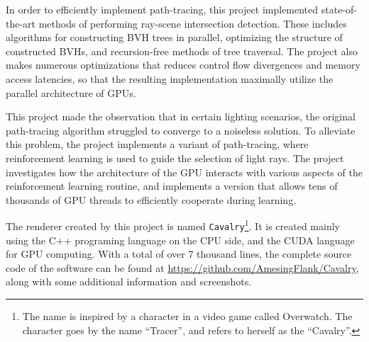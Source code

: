 In order to efficiently implement path-tracing, this project implemented state-of-the-art methods of performing ray-scene intersection detection. These includes algorithms for constructing BVH trees in parallel, optimizing the structure of constructed BVHs, and recursion-free methods of tree traversal. The project also makes numerous optimizations that reduces control flow divergences and memory access latencies, so that the resulting implementation maximally utilize the parallel architecture of GPUs.  

This project made the observation that in certain lighting scenarios, the original path-tracing algorithm struggled to converge to a noiseless solution. To alleviate this problem, the project implements a variant of path-tracing, where reinforcement learning is used to guide the selection of light rays. The project investigates how the architecture of the GPU interacts with various aspects of the reinforcement learning routine, and implements a version that allows tens of thousands of GPU threads to efficiently cooperate during learning. 


The renderer created by this project is named \texttt{Cavalry}\footnote{The name is inspired by a character in a video game called Overwatch. The character goes by the name ``Tracer'', and refers to herself as the ``Cavalry''.}. It is created mainly using the C++ programing language on the CPU side, and the CUDA language for GPU computing. With a total of over 7 thousand lines, the complete source code of the software can be found at \url{https://github.com/AmesingFlank/Cavalry}, along with some additional information and screenshots.
